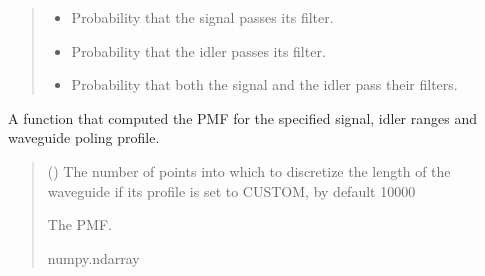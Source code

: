 \documentclass[a4paper,10pt,english]{sphinxmanual}
\begin{document}
\begin{fulllineitems}
\begin{fulllineitems}
\begin{quote}
\begin{description}
\begin{itemize}
\item {} 
\sphinxAtStartPar
{} \textendash{} Probability that the signal passes its filter.

\item {} 
\sphinxAtStartPar
{} \textendash{} Probability that the idler passes its filter.

\item {} 
\sphinxAtStartPar
{} \textendash{} Probability that both the signal and the idler pass their filters.

\end{itemize}


\end{description}\end{quote}

\end{fulllineitems}


\begin{fulllineitems}
\label{\detokenize{experiment:pyjsa.experiment.Experiment.phase_matching_function}}
\pysigstartsignatures
{}
\pysigstopsignatures
\sphinxAtStartPar
A function that computed the PMF for the specified signal, idler ranges and waveguide poling profile.
\begin{quote}\begin{description}
\sphinxAtStartPar
{} (\sphinxstyleliteralemphasis{\sphinxupquote{, }}) \textendash{} The number of points into which to discretize the length of the waveguide if its profile is set to CUSTOM, by default 10000

\sphinxAtStartPar
The PMF.

\sphinxAtStartPar
numpy.ndarray

\end{description}\end{quote}

\end{fulllineitems}


\end{fulllineitems}
\end{document}

